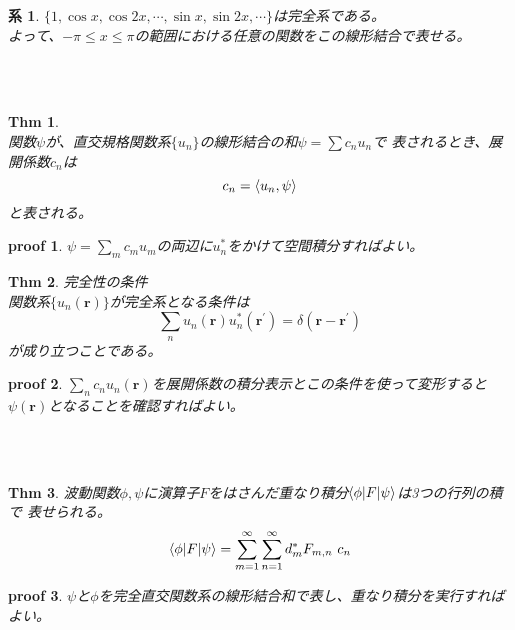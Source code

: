 \documentclass{jsarticle}
\newtheorem{thm}{Thm}[section]
\newtheorem{co}{系}[section]
\newtheorem{pf}{proof}[section]
\begin{document}
\begin{co}\(\{1,\cos x,\cos2x,\cdots,\sin x,\sin2x,\cdots\}\)は完全系である。\\
    よって、\(-\pi\leq x\leq\pi\)の範囲における任意の関数をこの線形結合で表せる。
\end{co}

~\\~
\begin{thm}~\\
    関数\(\psi\)が、直交規格関数系\(\{u_{n}\}\)の線形結合の和\(\displaystyle\psi=\sum c_{n}u_{n}\)で
    表されるとき、展開係数\(c_{n}\)は
    \begin{equation}
        c_{n}=\braket{u_{n},\psi}
    \end{equation}
    と表される。
\end{thm}
\begin{pf}\(\psi=\sum_{m}c_{m}u_{m}\)の両辺に\(u_{n}^{*}\)をかけて空間積分すればよい。
\end{pf}

\newpage
\begin{thm} 完全性の条件\\
    関数系\(\{u_{n}(\bm{r})\}\)が完全系となる条件は
    \begin{equation}
        \sum_{n}u_{n}(\bm{r})u_{n}^{*}(\bm{r}^{\prime})=\delta(\bm{r}-\bm{r}^{\prime})
    \end{equation}
    が成り立つことである。
\end{thm}
\begin{pf}\(\sum_{n}c_{n}u_{n}(\bm{r})\)を展開係数の積分表示とこの条件を使って変形すると
    \(\psi(\bm{r})\)となることを確認すればよい。
\end{pf}

~\\~
\begin{thm}
    波動関数\(\phi,\psi\)に演算子\(F\)をはさんだ重なり積分\(\braket{\phi|F|\psi}\)は3つの行列の積で
    表せられる。
    \begin{equation}
        \braket{\phi|F|\psi}=\sum_{m=1}^{\infty}\sum_{n=1}^{\infty}d_{m}^{*}F_{m,n}~c_{n}
    \end{equation}
\end{thm}
\begin{pf}\(\psi\)と\(\phi\)を完全直交関数系の線形結合和で表し、重なり積分を実行すればよい。
\end{pf}
\end{document}
